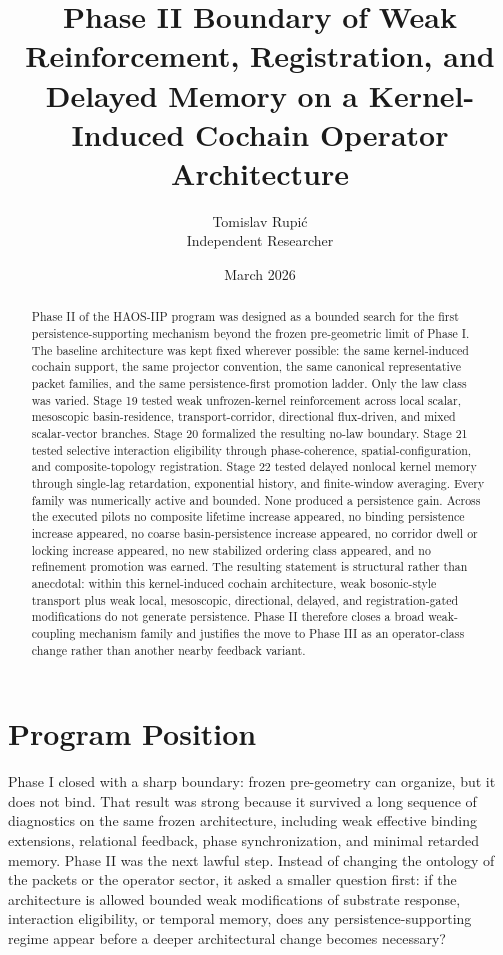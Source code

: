 \documentclass[11pt]{article}
\title{Phase II Boundary of Weak Reinforcement, Registration, and Delayed Memory on a Kernel-Induced Cochain Operator Architecture}
\author{Tomislav Rupi\'c \\ Independent Researcher}
\date{March 2026}
\begin{document}
\maketitle

\begin{abstract}
Phase II of the HAOS-IIP program was designed as a bounded search for the first persistence-supporting mechanism beyond the frozen pre-geometric limit of Phase I. The baseline architecture was kept fixed wherever possible: the same kernel-induced cochain support, the same projector convention, the same canonical representative packet families, and the same persistence-first promotion ladder. Only the law class was varied. Stage 19 tested weak unfrozen-kernel reinforcement across local scalar, mesoscopic basin-residence, transport-corridor, directional flux-driven, and mixed scalar-vector branches. Stage 20 formalized the resulting no-law boundary. Stage 21 tested selective interaction eligibility through phase-coherence, spatial-configuration, and composite-topology registration. Stage 22 tested delayed nonlocal kernel memory through single-lag retardation, exponential history, and finite-window averaging. Every family was numerically active and bounded. None produced a persistence gain. Across the executed pilots no composite lifetime increase appeared, no binding persistence increase appeared, no coarse basin-persistence increase appeared, no corridor dwell or locking increase appeared, no new stabilized ordering class appeared, and no refinement promotion was earned. The resulting statement is structural rather than anecdotal: within this kernel-induced cochain architecture, weak bosonic-style transport plus weak local, mesoscopic, directional, delayed, and registration-gated modifications do not generate persistence. Phase II therefore closes a broad weak-coupling mechanism family and justifies the move to Phase III as an operator-class change rather than another nearby feedback variant.
\end{abstract}

\section{Program Position}

Phase I closed with a sharp boundary: frozen pre-geometry can organize, but it does not bind. That result was strong because it survived a long sequence of diagnostics on the same frozen architecture, including weak effective binding extensions, relational feedback, phase synchronization, and minimal retarded memory. Phase II was the next lawful step. Instead of changing the ontology of the packets or the operator sector, it asked a smaller question first: if the architecture is allowed bounded weak modifications of substrate response, interaction eligibility, or temporal memory, does any persistence-supporting regime appear before a deeper architectural change becomes necessary?
\end{document}

